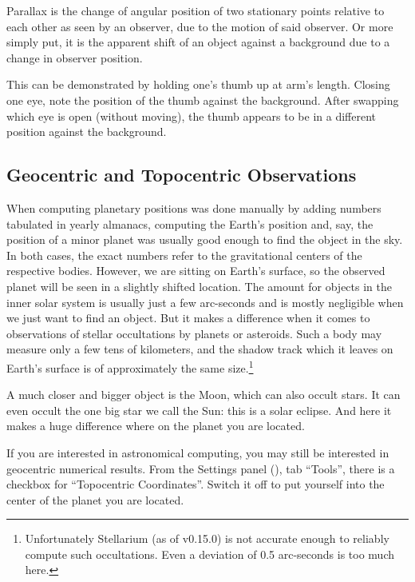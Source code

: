 Parallax is the change of angular position of two stationary points
relative to each other as seen by an observer, due to the motion of said
observer. Or more simply put, it is the apparent shift of an object
against a background due to a change in observer position.

This can be demonstrated by holding one's thumb up at arm's length.
Closing one eye, note the position of the thumb against the background.
After swapping which eye is open (without moving), the thumb appears to
be in a different position against the background.

\subsection{Geocentric and Topocentric Observations}
\label{sec:Concepts:Parallax:Topocentric}


When computing planetary positions was done manually by adding numbers
tabulated in yearly almanacs, computing the Earth's position and, say, the
position of a minor planet was usually good enough to find the object
in the sky. In both cases, the exact numbers refer to the
gravitational centers of the respective bodies. However, we are
sitting on Earth's surface, so the observed planet will be seen in a
slightly shifted location. The amount for objects in the inner solar
system is usually just a few arc-seconds and is mostly negligible when we
just want to find an object. But it makes a difference when it comes
to observations of stellar occultations by planets or asteroids. Such
a body may measure only a few tens of kilometers, and the shadow track
which it leaves on Earth's surface is of approximately the same
size.\footnote{Unfortunately Stellarium (as of v0.15.0) is not accurate
  enough to reliably compute such occultations. Even a deviation of
  0.5 arc-seconds is too much here.}

A much closer and bigger object is the Moon, which can also occult
stars. It can even occult the one big star we call the Sun: this is a
solar eclipse. And here it makes a huge difference where on the planet
you are located. 

If you are interested in astronomical computing, you may still be
interested in geocentric numerical results. From the Settings panel
(), tab ``Tools'', there is a checkbox for ``Topocentric
Coordinates''. Switch it off to put yourself into the center of the
planet you are located.

